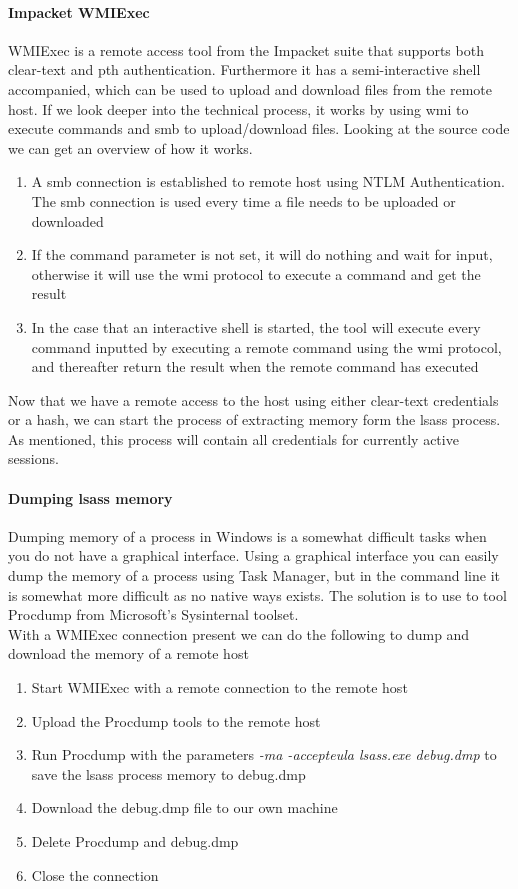 \documentclass{article}
\begin{document}
\paragraph{Impacket WMIExec} WMIExec is a remote access tool from the Impacket suite that supports both clear-text and \gls{pth} authentication. Furthermore it has a semi-interactive shell accompanied, which can be used to upload and download files from the remote host. If we look deeper into the technical process, it works by using \gls{wmi} to execute commands and \gls{smb} to upload/download files. Looking at the source code\cite{url:impacket:wmiexec} we can get an overview of how it works.

\begin{enumerate}
    \item A \gls{smb} connection is established to remote host using NTLM Authentication. The \gls{smb} connection is used every time a file needs to be uploaded or downloaded
    \item If the command parameter is not set, it will do nothing and wait for input, otherwise it will use the \gls{wmi} protocol to execute a command and get the result
    \item In the case that an interactive shell is started, the tool will execute every command inputted by executing a remote command using the \gls{wmi} protocol, and thereafter return the result when the remote command has executed
\end{enumerate}

Now that we have a remote access to the host using either clear-text credentials or a hash, we can start the process of extracting memory form the \gls{lsass} process. As mentioned, this process will contain all credentials for currently active sessions.

\paragraph{Dumping \gls{lsass} memory}
Dumping memory of a process in Windows is a somewhat difficult tasks when you do not have a graphical interface. Using a graphical interface you can easily dump the memory of a process using Task Manager\cite{url:microsoft:dump-memory-task-manager}, but in the command line it is somewhat more difficult as no native ways exists. The solution is to use to tool Procdump from Microsoft's Sysinternal toolset.\\
With a WMIExec connection present we can do the following to dump and download the memory of a remote host
\begin{enumerate}
    \item Start WMIExec with a remote connection to the remote host
    \item Upload the Procdump tools to the remote host
    \item Run Procdump with the parameters \emph{-ma -accepteula lsass.exe debug.dmp} to save the \gls{lsass} process memory to debug.dmp
    \item Download the debug.dmp file to our own machine
    \item Delete Procdump and debug.dmp
    \item Close the connection
\end{enumerate}
\end{document}
